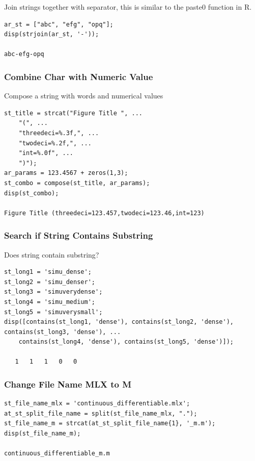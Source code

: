 \documentclass[
]{book}
\begin{document}
Join strings together with separator, this is similar to the paste0
function in R.

\begin{verbatim}
ar_st = ["abc", "efg", "opq"];
disp(strjoin(ar_st, '-'));

abc-efg-opq
\end{verbatim}

\hypertarget{combine-char-with-numeric-value}{%
\subsubsection{Combine Char with Numeric Value}\label{combine-char-with-numeric-value}}

Compose a string with words and numerical values

\begin{verbatim}
st_title = strcat("Figure Title ", ...
    "(", ...
    "threedeci=%.3f,", ...
    "twodeci=%.2f,", ...
    "int=%.0f", ...
    ")");
ar_params = 123.4567 + zeros(1,3);
st_combo = compose(st_title, ar_params);
disp(st_combo);

Figure Title (threedeci=123.457,twodeci=123.46,int=123)
\end{verbatim}

\hypertarget{search-if-string-contains-substring}{%
\subsubsection{Search if String Contains Substring}\label{search-if-string-contains-substring}}

Does string contain substring?

\begin{verbatim}
st_long1 = 'simu_dense';
st_long2 = 'simu_denser';
st_long3 = 'simuverydense';
st_long4 = 'simu_medium';
st_long5 = 'simuverysmall';
disp([contains(st_long1, 'dense'), contains(st_long2, 'dense'), contains(st_long3, 'dense'), ...
    contains(st_long4, 'dense'), contains(st_long5, 'dense')]);

   1   1   1   0   0
\end{verbatim}

\hypertarget{change-file-name-mlx-to-m}{%
\subsubsection{Change File Name MLX to M}\label{change-file-name-mlx-to-m}}

\begin{verbatim}
st_file_name_mlx = 'continuous_differentiable.mlx';
at_st_split_file_name = split(st_file_name_mlx, ".");
st_file_name_m = strcat(at_st_split_file_name{1}, '_m.m');
disp(st_file_name_m);

continuous_differentiable_m.m
\end{verbatim}
\end{document}
